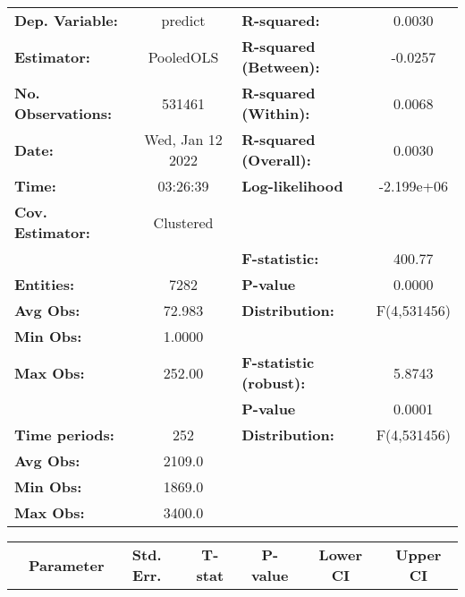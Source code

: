 \begin{center}
\begin{tabular}{lclc}
\toprule
\textbf{Dep. Variable:}    &      predict       & \textbf{  R-squared:         }   &      0.0030      \\
\textbf{Estimator:}        &     PooledOLS      & \textbf{  R-squared (Between):}  &     -0.0257      \\
\textbf{No. Observations:} &       531461       & \textbf{  R-squared (Within):}   &      0.0068      \\
\textbf{Date:}             &  Wed, Jan 12 2022  & \textbf{  R-squared (Overall):}  &      0.0030      \\
\textbf{Time:}             &      03:26:39      & \textbf{  Log-likelihood     }   &    -2.199e+06    \\
\textbf{Cov. Estimator:}   &     Clustered      & \textbf{                     }   &                  \\
\textbf{}                  &                    & \textbf{  F-statistic:       }   &      400.77      \\
\textbf{Entities:}         &        7282        & \textbf{  P-value            }   &      0.0000      \\
\textbf{Avg Obs:}          &       72.983       & \textbf{  Distribution:      }   &   F(4,531456)    \\
\textbf{Min Obs:}          &       1.0000       & \textbf{                     }   &                  \\
\textbf{Max Obs:}          &       252.00       & \textbf{  F-statistic (robust):} &      5.8743      \\
\textbf{}                  &                    & \textbf{  P-value            }   &      0.0001      \\
\textbf{Time periods:}     &        252         & \textbf{  Distribution:      }   &   F(4,531456)    \\
\textbf{Avg Obs:}          &       2109.0       & \textbf{                     }   &                  \\
\textbf{Min Obs:}          &       1869.0       & \textbf{                     }   &                  \\
\textbf{Max Obs:}          &       3400.0       & \textbf{                     }   &                  \\
\bottomrule
\end{tabular}
\begin{tabular}{lcccccc}
                & \textbf{Parameter} & \textbf{Std. Err.} & \textbf{T-stat} & \textbf{P-value} & \textbf{Lower CI} & \textbf{Upper CI}  \\

\end{tabular}
\end{center}
